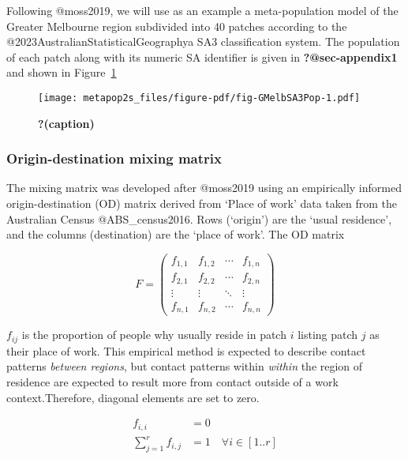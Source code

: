 \documentclass[
  letterpaper,
  DIV=11,
  numbers=noendperiod]{scrartcl}
\begin{document}
Following @moss2019, we will use as an example a meta-population model
of the Greater Melbourne region subdivided into 40 patches according to
the @2023AustralianStatisticalGeographya SA3 classification system. The
population of each patch along with its numeric SA identifier is given
in \textbf{?@sec-appendix1} and shown in Figure~\ref{fig-GMelbSA3Pop}

\begin{figure}

{\centering \texttt{[image: metapop2s\_files/figure-pdf/fig-GMelbSA3Pop-1.pdf]}

}

\caption{\label{fig-GMelbSA3Pop}\textbf{?(caption)}}

\end{figure}

\hypertarget{origin-destination-mixing-matrix}{%
\subsubsection{Origin-destination mixing
matrix}\label{origin-destination-mixing-matrix}}

The mixing matrix was developed after @moss2019 using an empirically
informed origin-destination (OD) matrix derived from `Place of work'
data taken from the Australian Census @ABS\_census2016. Rows (`origin')
are the `usual residence', and the columns (destination) are the `place
of work'. The OD matrix

\[
F=\left(\begin{array}{cccc}f_{1,1} & f_{1,2} & \cdots & f_{1, n} \\f_{2,1} & f_{2,2} & \cdots & f_{2, n} \\ \vdots & \vdots & \ddots & \vdots \\f_{n, 1} & f_{n, 2} & \cdots & f_{n, n}\end{array}\right)
\]

\(f_{ij}\) is the proportion of people why usually reside in patch \(i\)
listing patch \(j\) as their place of work. This empirical method is
expected to describe contact patterns \emph{between regions}, but
contact patterns within \emph{within} the region of residence are
expected to result more from contact outside of a work
context.Therefore, diagonal elements are set to zero.

\[
\begin{aligned}
f_{i, i} & =0 \\
\sum_{j=1}^{r} f_{i, j} & =1 \quad \forall i \in [1 . . r]
\end{aligned}
\]
\end{document}
